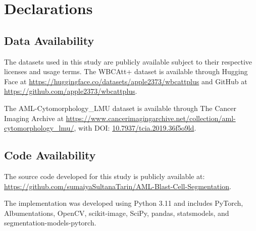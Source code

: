 \documentclass[pdflatex,sn-mathphys-num]{sn-jnl}%
\theoremstyle{thmstyleone}%
\theoremstyle{thmstyletwo}%
\theoremstyle{thmstylethree}%
\begin{document}
\backmatter


\section*{Declarations}

\subsection*{Data Availability}

The datasets used in this study are publicly available subject to their respective licenses and usage terms. The WBCAtt+ dataset is available through Hugging Face at
\url{https://huggingface.co/datasets/apple2373/wbcattplus}
and GitHub at
\url{https://github.com/apple2373/wbcattplus}.

The AML-Cytomorphology\_LMU dataset is available through The Cancer Imaging Archive at
\url{https://www.cancerimagingarchive.net/collection/aml-cytomorphology_lmu/},
with DOI:
\href{https://doi.org/10.7937/tcia.2019.36f5o9ld}{10.7937/tcia.2019.36f5o9ld}.

\subsection*{Code Availability}

The source code developed for this study is publicly available at:
\url{https://github.com/sumaiyaSultanaTarin/AML-Blast-Cell-Segmentation}.

The implementation was developed using Python 3.11 and includes PyTorch, Albumentations, OpenCV, scikit-image, SciPy, pandas, statsmodels, and segmentation-models-pytorch.

\end{document}
